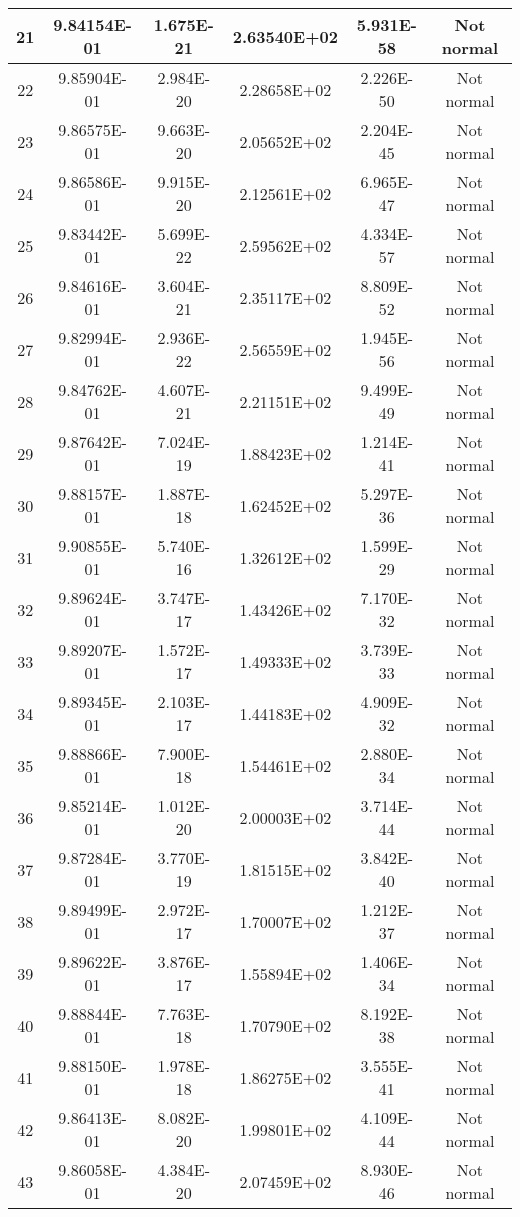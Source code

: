 \begin{table}[h]
\begin{tabular}{|c|c|c|c|c|c|}
		21 & 9.84154E-01 & 1.675E-21 & 2.63540E+02 & 5.931E-58 & Not normal\\\hline
		22 & 9.85904E-01 & 2.984E-20 & 2.28658E+02 & 2.226E-50 & Not normal\\\hline
		23 & 9.86575E-01 & 9.663E-20 & 2.05652E+02 & 2.204E-45 & Not normal\\\hline
		24 & 9.86586E-01 & 9.915E-20 & 2.12561E+02 & 6.965E-47 & Not normal\\\hline
		25 & 9.83442E-01 & 5.699E-22 & 2.59562E+02 & 4.334E-57 & Not normal\\\hline
		26 & 9.84616E-01 & 3.604E-21 & 2.35117E+02 & 8.809E-52 & Not normal\\\hline
		27 & 9.82994E-01 & 2.936E-22 & 2.56559E+02 & 1.945E-56 & Not normal\\\hline
		28 & 9.84762E-01 & 4.607E-21 & 2.21151E+02 & 9.499E-49 & Not normal\\\hline
		29 & 9.87642E-01 & 7.024E-19 & 1.88423E+02 & 1.214E-41 & Not normal\\\hline
		30 & 9.88157E-01 & 1.887E-18 & 1.62452E+02 & 5.297E-36 & Not normal\\\hline
		31 & 9.90855E-01 & 5.740E-16 & 1.32612E+02 & 1.599E-29 & Not normal\\\hline
		32 & 9.89624E-01 & 3.747E-17 & 1.43426E+02 & 7.170E-32 & Not normal\\\hline
		33 & 9.89207E-01 & 1.572E-17 & 1.49333E+02 & 3.739E-33 & Not normal\\\hline
		34 & 9.89345E-01 & 2.103E-17 & 1.44183E+02 & 4.909E-32 & Not normal\\\hline
		35 & 9.88866E-01 & 7.900E-18 & 1.54461E+02 & 2.880E-34 & Not normal\\\hline
		36 & 9.85214E-01 & 1.012E-20 & 2.00003E+02 & 3.714E-44 & Not normal\\\hline
		37 & 9.87284E-01 & 3.770E-19 & 1.81515E+02 & 3.842E-40 & Not normal\\\hline
		38 & 9.89499E-01 & 2.972E-17 & 1.70007E+02 & 1.212E-37 & Not normal\\\hline
		39 & 9.89622E-01 & 3.876E-17 & 1.55894E+02 & 1.406E-34 & Not normal\\\hline
		40 & 9.88844E-01 & 7.763E-18 & 1.70790E+02 & 8.192E-38 & Not normal\\\hline
		41 & 9.88150E-01 & 1.978E-18 & 1.86275E+02 & 3.555E-41 & Not normal\\\hline
		42 & 9.86413E-01 & 8.082E-20 & 1.99801E+02 & 4.109E-44 & Not normal\\\hline
		43 & 9.86058E-01 & 4.384E-20 & 2.07459E+02 & 8.930E-46 & Not normal\\\hline

\end{tabular}
\end{table}
